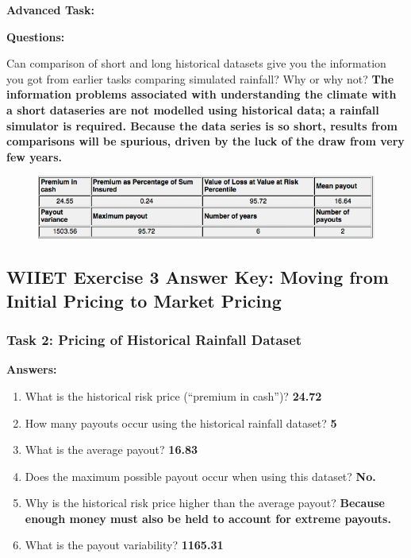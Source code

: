 \documentclass[letterpaper,10pt,english]{sphinxmanual}
\begin{document}
\textbf{Advanced Task:}

\textbf{Questions:}

Can comparison of short and long historical datasets give you the information you got from earlier tasks comparing simulated rainfall? Why or why not? \textbf{The information problems associated with understanding the climate with a short dataseries are not modelled using historical data; a rainfall simulator is required. Because the data series is so short, results from comparisons will be spurious, driven by the luck of the draw from very few years.}
\begin{figure}[htbp]
\centering

\includegraphics{premium4.png}
\end{figure}


\subsection{WIIET Exercise 3 Answer Key: Moving from Initial Pricing to Market Pricing}
\label{wiiet/wiiet_initialtomarketpricinganskey::doc}\label{wiiet/wiiet_initialtomarketpricinganskey:wiiet-exercise-3-answer-key-moving-from-initial-pricing-to-market-pricing}

\subsubsection{Task 2: Pricing of Historical Rainfall Dataset}
\label{wiiet/wiiet_initialtomarketpricinganskey:task-2-pricing-of-historical-rainfall-dataset}
\textbf{Answers:}
\begin{enumerate}
\item {} 
What is the historical risk price (``premium in cash'')? \textbf{24.72}

\item {} 
How many payouts occur using the historical rainfall dataset? \textbf{5}

\item {} 
What is the average payout? \textbf{16.83}

\item {} 
Does the maximum possible payout occur when using this dataset? \textbf{No.}

\item {} 
Why is the historical risk price higher than the average payout?  \textbf{Because enough money must also be held to account for extreme payouts.}

\item {} 
What is the payout variability? \textbf{1165.31}

\end{enumerate}
\end{document}
